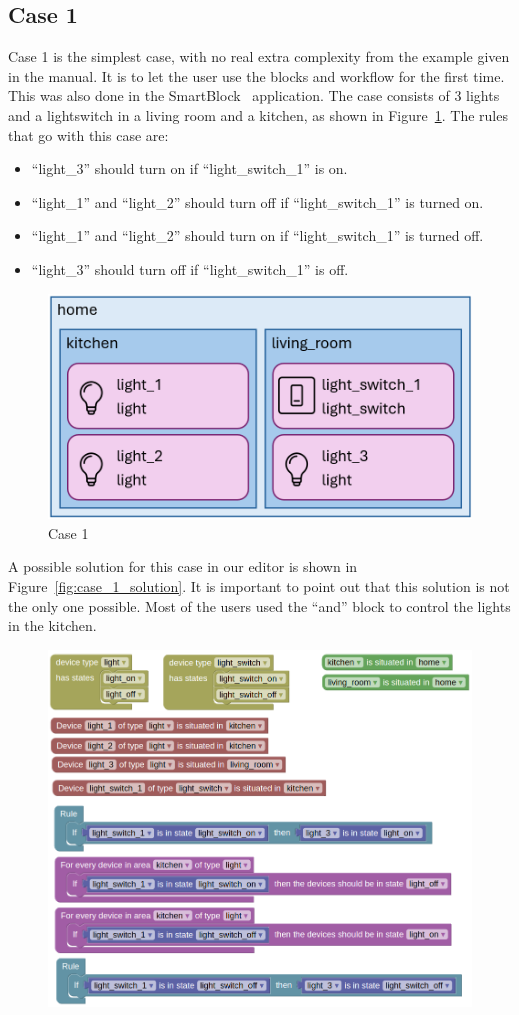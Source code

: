 \documentclass[11pt,a4paper]{report}
\begin{document}
\begin{idplisting}
\subsection{Case 1}
Case 1 is the simplest case, with no real extra complexity from the example given in the manual. It is to let the user use the blocks and workflow for the first time. This was also done in the SmartBlock~\cite{SOTA_SmartBlock} application. The case consists of 3 lights and a lightswitch in a living room and a kitchen, as shown in Figure~\ref{fig:case_1}. The rules that go with this case are:
\begin{itemize}
    \item ``light\_3'' should turn on if ``light\_switch\_1'' is on.
    \item ``light\_1'' and ``light\_2'' should turn off if ``light\_switch\_1'' is turned on.
    \item ``light\_1'' and ``light\_2'' should turn on if ``light\_switch\_1'' is turned off.
    \item ``light\_3'' should turn off if ``light\_switch\_1'' is off.
\end{itemize}
\begin{figure}
    \centering
    \includegraphics[width=0.8\linewidth]{images/case_1.png}
    \caption{Case 1}
    \label{fig:case_1}
\end{figure}
A possible solution for this case in our editor is shown in Figure~\ref{fig:case_1_solution}. It is important to point out that this solution is not the only one possible. Most of the users used the ``and'' block to control the lights in the kitchen.
\begin{figure}
    \centering
    \includegraphics[width=0.8\linewidth]{images/case_1_homy.png}

\end{figure}
\end{idplisting}
\end{document}
